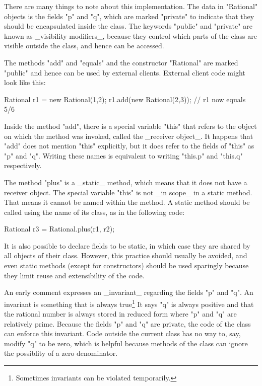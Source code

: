 \documentclass{article}
\begin{document}
There are many things to note about this implementation. The data in
"Rational" objects is the fields "p" and "q", which are marked
"private" to indicate that they should be encapsulated inside the
class. The keywords "public" and "private" are known as _visibility
modifiers_, because they control which parts of the class are visible
outside the class, and hence can be accessed.

The methods "add" and "equals" and the constructor "Rational" are marked "public"
and hence can be used by external clients. External client code might
look like this:

\begin{code}
Rational r1 = new Rational(1,2);
r1.add(new Rational(2,3));
// r1 now equals 5/6
\end{code}

Inside the method "add", there is a special variable "this" that
refers to the object on which the method was invoked, called the
_receiver object_. It happens that "add" does not mention "this"
explicitly, but it does refer to the fields of "this" as "p" and "q".
Writing these names is equivalent to writing "this.p" and "this.q"
respectively.

The method "plus" is a _static_ method, which means that it does not
have a receiver object. The special variable "this" is not _in scope_
in a static method. That means it cannot be named within the method. A
static method should be called using the name of its class, as in the
following code:

\begin{code}
Rational r3 = Rational.plus(r1, r2);
\end{code}

\noindent It is also possible to declare fields to be static, in which
case they are shared by all objects of their class. However, this
practice should usually be avoided, and even static methods
(except for constructors) should be used sparingly because they limit
reuse and extensibility of the code.

An early comment expresses an _invariant_ regarding the fields "p" and
"q".  An invariant is something that is always true\footnote{Sometimes
invariants can be violated temporarily.} It says "q" is always
positive and that the rational number is always stored in reduced form
where "p" and "q" are relatively prime. Because the fields "p" and "q"
are private, the code of the class can enforce this invariant. Code
outside the current class has no way to, say, modify "q" to be zero,
which is helpful because methods of the class can ignore the
possiblity of a zero denominator.
\end{document}
